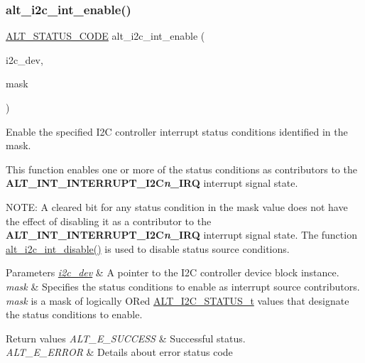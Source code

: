 \subsubsection{\texorpdfstring{alt\_i2c\_int\_enable()}{alt\_i2c\_int\_enable()}}
{\footnotesize\ttfamily \mbox{\hyperlink{hwlib_8h_abdb0d369f069723ca55d6c94bcaaaa12}{A\+L\+T\+\_\+\+S\+T\+A\+T\+U\+S\+\_\+\+C\+O\+DE}} alt\+\_\+i2c\+\_\+int\+\_\+enable (\begin{DoxyParamCaption}\item[{\mbox{\hyperlink{structALT__I2C__DEV__s}{A\+L\+T\+\_\+\+I2\+C\+\_\+\+D\+E\+V\+\_\+t}} $\ast$}]{i2c\+\_\+dev,  }\item[{const uint32\+\_\+t}]{mask }\end{DoxyParamCaption})}

Enable the specified I2C controller interrupt status conditions identified in the mask.

This function enables one or more of the status conditions as contributors to the {\bfseries{A\+L\+T\+\_\+\+I\+N\+T\+\_\+\+I\+N\+T\+E\+R\+R\+U\+P\+T\+\_\+\+I2C{\itshape n}\+\_\+\+I\+RQ}} interrupt signal state.

N\+O\+TE\+: A cleared bit for any status condition in the mask value does not have the effect of disabling it as a contributor to the {\bfseries{A\+L\+T\+\_\+\+I\+N\+T\+\_\+\+I\+N\+T\+E\+R\+R\+U\+P\+T\+\_\+\+I2C{\itshape n}\+\_\+\+I\+RQ}} interrupt signal state. The function \mbox{\hyperlink{group__ALT__I2C__INT_gae81d1d1af98f385fd6202d382af93ecc}{alt\+\_\+i2c\+\_\+int\+\_\+disable()}} is used to disable status source conditions.


\begin{DoxyParams}{Parameters}
{\em \mbox{\hyperlink{structi2c__dev}{i2c\+\_\+dev}}} & A pointer to the I2C controller device block instance.\\
\hline
{\em mask} & Specifies the status conditions to enable as interrupt source contributors. {\itshape mask} is a mask of logically OR\textquotesingle{}ed \mbox{\hyperlink{group__ALT__I2C_gaff6fbc8f47536dd27035588f0ea138fe}{A\+L\+T\+\_\+\+I2\+C\+\_\+\+S\+T\+A\+T\+U\+S\+\_\+t}} values that designate the status conditions to enable.\\
\hline
\end{DoxyParams}

\begin{DoxyRetVals}{Return values}
{\em A\+L\+T\+\_\+\+E\+\_\+\+S\+U\+C\+C\+E\+SS} & Successful status. \\
\hline
{\em A\+L\+T\+\_\+\+E\+\_\+\+E\+R\+R\+OR} & Details about error status code \\
\hline
\end{DoxyRetVals}
\mbox{\label{group__ALT__I2C__INT_ga15ff55010cad84db0476be38e064851d}} 
